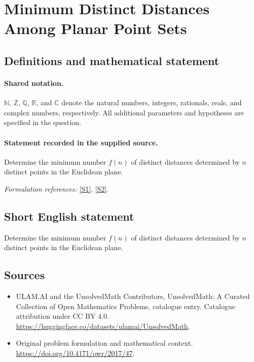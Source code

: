 \documentclass[11pt]{article}
\newcommand{\sref}[2]{\hyperlink{source:#1:#2}{[S#2]}}
\begin{document}
\section{Minimum Distinct Distances Among Planar Point Sets}\label{statement}

\subsection{Definitions and mathematical statement}

\paragraph{Shared notation.}$\mathbb N$, $\mathbb Z$, $\mathbb Q$, $\mathbb R$, and $\mathbb C$ denote the natural numbers, integers, rationals, reals, and complex numbers, respectively. All additional parameters and hypotheses are specified in the question.


\paragraph{Statement recorded in the supplied source.}
Determine the minimum number $f(n)$ of distinct distances determined by $n$ distinct points in the Euclidean plane.
\par\smallskip\textit{Formulation references:} \sref{statement}{1}, \sref{statement}{2}.
\subsection{Short English statement}
Determine the minimum number $f(n)$ of distinct distances determined by $n$ distinct points in the Euclidean plane.
\subsection{Sources}
\begin{itemize}
\item[\hypertarget{source:statement:1}{S1}] ULAM.AI and the UnsolvedMath Contributors, UnsolvedMath: A Curated Collection of Open Mathematics Problems, catalogue entry. Catalogue attribution under CC BY 4.0.
\url{https://huggingface.co/datasets/ulamai/UnsolvedMath}.
\item[\hypertarget{source:statement:2}{S2}] Original problem formulation and mathematical context.
\url{https://doi.org/10.4171/owr/2017/47}.
\end{itemize}
\label{end:statement}
\end{document}
